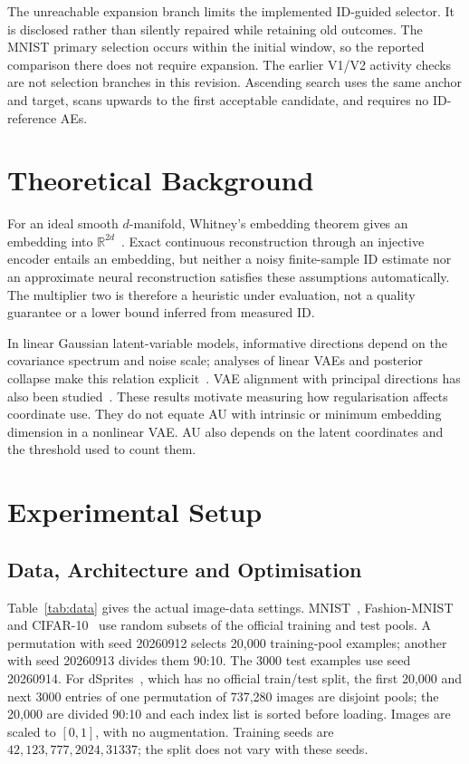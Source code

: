 \documentclass[make,article,submit,pdftex,moreauthors]{Definitions/mdpi}
\begin{document}
The unreachable expansion branch limits the implemented ID-guided
selector. It is disclosed rather than silently repaired while retaining
old outcomes. The MNIST primary selection occurs within the initial
window, so the reported comparison there does not require expansion.
The earlier V1/V2 activity checks are not selection branches in this
revision. Ascending search uses the same anchor and target, scans upwards
to the first acceptable candidate, and requires no ID-reference AEs.

\section{Theoretical Background}\label{sec:theory}
For an ideal smooth $d$-manifold, Whitney's embedding theorem gives an
embedding into $\mathbb R^{2d}$~\cite{whitney1944}. Exact continuous
reconstruction through an injective encoder entails an embedding, but
neither a noisy finite-sample ID estimate nor an approximate neural
reconstruction satisfies these assumptions automatically. The multiplier
two is therefore a heuristic under evaluation, not a quality guarantee or
a lower bound inferred from measured ID.

In linear Gaussian latent-variable models, informative directions depend
on the covariance spectrum and noise scale; analyses of linear VAEs and
posterior collapse make this relation explicit~\cite{tippingbishop1999ppca,lucas2019elbo}.
VAE alignment with principal directions has also been
studied~\cite{rolinek2019pca}. These results motivate measuring how
regularisation affects coordinate use. They do not equate AU with
intrinsic or minimum embedding dimension in a nonlinear VAE. AU also
depends on the latent coordinates and the threshold used to count them.

\section{Experimental Setup}\label{sec:setup}

\subsection{Data, Architecture and Optimisation}
Table~\ref{tab:data} gives the actual image-data settings.
MNIST~\cite{lecun1998}, Fashion-MNIST~\cite{xiao2017fashion} and
CIFAR-10~\cite{krizhevsky2009learning} use random subsets of the official
training and test pools. A permutation with seed 20260912 selects 20,000
training-pool examples; another with seed 20260913 divides them 90:10.
The 3000 test examples use seed 20260914. For
dSprites~\cite{matthey2017dsprites}, which has no official train/test
split, the first 20,000 and next 3000 entries of one permutation of
737,280 images are disjoint pools; the 20,000 are divided 90:10 and each
index list is sorted before loading. Images are scaled to $[0,1]$, with
no augmentation. Training seeds are $42,123,777,2024,31337$; the split
does not vary with these seeds.
\end{document}
